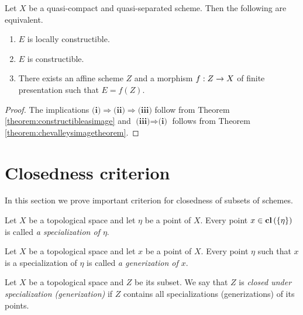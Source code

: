 \begin{corollary}
Let $X$ be a quasi-compact and quasi-separated scheme. Then the following are equivalent.
\begin{enumerate}[label=\emph{\textbf{(\roman*)}}, leftmargin=*]
\item $E$ is locally constructible.
\item $E$ is constructible.
\item There exists an affine scheme $Z$ and a morphism $f:Z\rightarrow X$ of finite presentation such that $E = f(Z)$.
\end{enumerate}
\end{corollary}
\begin{proof}
The implications $\textbf{(i)}\Rightarrow \textbf{(ii)}\Rightarrow \textbf{(iii)}$ follow from Theorem \ref{theorem:constructibleasimage} and $\textbf{(iii)}\Rightarrow \textbf{(i)}$ follows from Theorem \ref{theorem:chevalleysimagetheorem}.
\end{proof}

\section{Closedness criterion}
\noindent
In this section we prove important criterion for closedness of subsets of schemes. 

\begin{definition}
Let $X$ be a topological space and let $\eta$ be a point of $X$. Every point $x\in \mathbf{cl}\left(\{\eta \}\right)$ is called \textit{a specialization of $\eta$}.
\end{definition}

\begin{definition}
Let $X$ be a topological space and let $x$ be a point of $X$. Every point $\eta$ such that $x$ is a specialization of $\eta$ is called \textit{a generization of $x$}.
\end{definition}

\begin{definition}
Let $X$ be a topological space and $Z$ be its subset. We say that $Z$ is \textit{closed under specialization (generization)} if $Z$ contains all specializations (generizations) of its points.
\end{definition}

